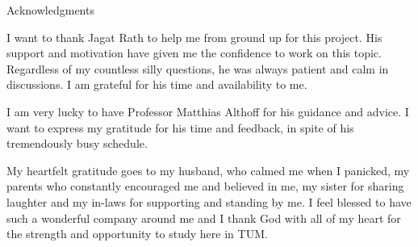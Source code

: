 \thispagestyle{empty}

\vspace*{2cm}

\begin{center}
{ Acknowledgments}
\end{center}

\vspace{1cm}

I want to thank Jagat Rath to help me from ground up for this project. His support and motivation have given me the confidence to work on this topic. Regardless of my countless silly questions, he was always patient and calm in discussions. I am grateful for his time and availability to me.

I am very lucky to have Professor Matthias Althoff for his guidance and advice. I want to express my gratitude for his time and feedback, in spite of his tremendously busy schedule.

My heartfelt gratitude goes to my husband, who calmed me when I panicked, my parents who constantly encouraged me and believed in me, my sister for sharing laughter and my in-laws for supporting and standing by me. I feel blessed to have such a wonderful company around me and I thank God with all of my heart for the strength and opportunity to study here in TUM.

\cleardoublepage{}
